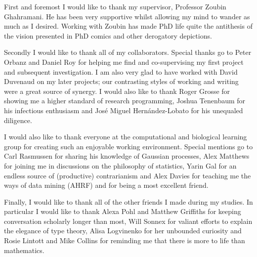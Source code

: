 
\begin{acknowledgements}      

First and foremost I would like to thank my supervisor, Professor Zoubin Ghahramani.
He has been very supportive whilst allowing my mind to wander as much as I desired.
Working with Zoubin has made PhD life quite the antithesis of the vision presented in PhD comics and other derogatory depictions.

Secondly I would like to thank all of my collaborators.
Special thanks go to Peter Orbanz and Daniel Roy for helping me find and co-supervising my first project and subsequent investigation.
I am also very glad to have worked with David Duvenaud on my later projects; our contrasting styles of working and writing were a great source of synergy.
I would also like to thank Roger Grosse for showing me a higher standard of research programming, Joshua Tenenbaum for his infectious enthusiasm and Jos\'{e} Miguel Hern\'{a}ndez-Lobato for his unequaled diligence.

I would also like to thank everyone at the computational and biological learning group for creating such an enjoyable working environment.
Special mentions go to Carl Rasmussen for sharing his knowledge of Gaussian processes, Alex Matthews for joining me in discussions on the philosophy of statistics, Yarin Gal for an endless source of (productive) contrarianism and Alex Davies for teaching me the ways of data mining (AHRF) and for being a most excellent friend.

Finally, I would like to thank all of the other friends I made during my studies.
In particular I would like to thank Alexa Pohl and Matthew Griffiths for keeping conversation scholarly longer than most, Will Sonnex for valiant efforts to explain the elegance of type theory, Alisa Logvinenko for her unbounded curiosity and Rosie Lintott and Mike Collins for reminding me that there is more to life than mathematics.

\end{acknowledgements}
